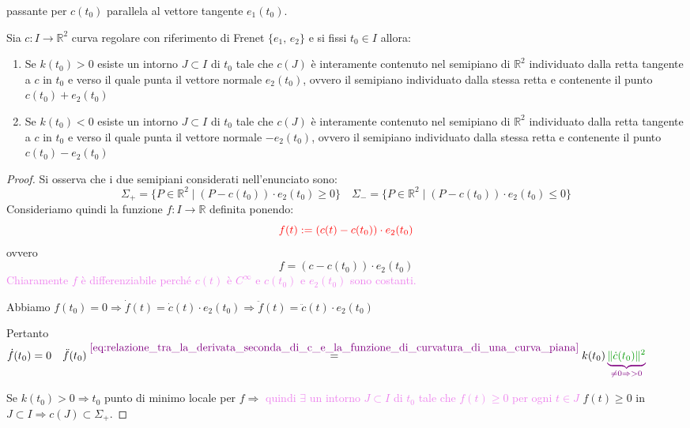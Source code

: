         passante per $c(t_0)$ parallela al vettore tangente $e_1(t_0)$.
        \begin{proposizione}
        \label{prop:segno_curvatura_semipiano}
        Sia $c \colon I \to \mathbb{R}^2$ curva regolare con riferimento di Frenet $\{e_1, \, e_2\}$ e si fissi $t_0 \in I$ allora:
        \begin{enumerate}
            \item Se $k(t_0) > 0$ esiste un intorno $J \subset I$ di $t_0$ tale che $c(J)$ è interamente contenuto nel semipiano di $\mathbb{R}^2$
             individuato dalla retta tangente a $c$ in $t_0$ e verso il quale punta il vettore normale $e_2(t_0)$, ovvero il semipiano individuato dalla stessa retta e contenente 
             il punto $c(t_0)+e_2(t_0)$
            \item Se $k(t_0) < 0$ esiste un intorno $J \subset I$ di $t_0$ tale che $c(J)$ è interamente contenuto nel semipiano di $\mathbb{R}^2$
             individuato dalla retta tangente a $c$ in $t_0$ e verso il quale punta il vettore normale $-e_2(t_0)$, ovvero il semipiano individuato dalla stessa retta e contenente 
             il punto $c(t_0)-e_2(t_0)$
        \end{enumerate}
        \end{proposizione}
        \begin{proof}
        Si osserva che i due semipiani considerati nell'enunciato sono:
        \[ \Sigma_+ = \{ P \in \mathbb{R}^2 \mid  \left( P - c(t_0) \right) \cdot e_2(t_0) \geq 0 \} \quad \Sigma_- = \{ P \in \mathbb{R}^2 \mid \left( P - c(t_0) \right) \cdot e_2(t_0) \leq 0 \} \]
        Consideriamo quindi la funzione $f \colon I \to \mathbb{R}$ definita ponendo:
        \[ \color{red} f(t) := \left( c(t) - c(t_0) \right) \cdot e_2(t_0) \]
        ovvero 
        \[ f = \left(c - c(t_0)\right) \cdot e_2(t_0) \]
        \textcolor{violet}{Chiaramente $f$ è differenziabile perché $c(t)$ è $C^\infty$ e $c(t_0)$ e $e_2(t_0)$ sono costanti.}

        Abbiamo $f(t_0) =0 \Rightarrow \dot{f}(t) = \dot{c}(t) \cdot e_2(t_0) \Rightarrow \ddot{f}(t) = \ddot{c}(t) \cdot e_2(t_0)$

        Pertanto $\dot{f}(t_0) = 0 \quad \ddot{f}(t_0) \overset{\textcolor{violet}{\eqref{eq:relazione_tra_la_derivata_seconda_di_c_e_la_funzione_di_curvatura_di_una_curva_piana}}}{=} k(t_0) \color{violet} \underbrace{\textcolor{verde}{\norm{\dot{c}(t_0)}^2}}_{\neq 0 \Rightarrow >0} $

        Se $k(t_0) > 0 \Rightarrow t_0$ punto di minimo locale per $f \Rightarrow $ \textcolor{violet}{quindi $\exists$ un intorno $J \subset I$ di $t_0$ tale che $f(t) \geq 0$ per ogni $t \in J$}
        $f(t) \geq 0$ in $J \subset I \Rightarrow c(J) \subset \Sigma_+$.
        \end{proof}
